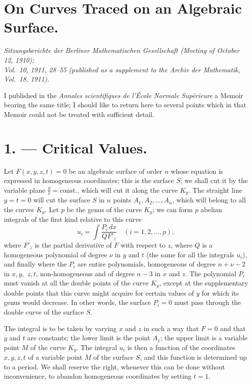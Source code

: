 \documentclass{article}
\begin{document}
\section*{On Curves Traced on an Algebraic Surface.}

\begin{center}
\emph{Sitzungsberichte der Berliner Mathematischen Gesellschaft (Meeting of October 12, 1910);}\\
\emph{Vol.~10, 1911, 28--55 (published as a supplement to the Archiv der Mathematik, Vol.~18, 1911).}
\end{center}

I published in the \emph{Annales scientifiques de l'École Normale Supérieure} a Memoir bearing the same title; I should like to return here to several points which in that Memoir could not be treated with sufficient detail.

\section*{1. --- Critical Values.}

Let $F(x, y, z, t) = 0$ be an algebraic surface of order $n$ whose equation is expressed in homogeneous coordinates; this is the surface $S$; we shall cut it by the variable plane $\frac{y}{t} = \text{const.}$, which will cut it along the curve $K_{y}$. The straight line $y = t = 0$ will cut the surface $S$ in $n$ points $A_{1}, A_{2}, \ldots, A_{n}$, which will belong to all the curves $K_{y}$. Let $p$ be the genus of the curve $K_{y}$; we can form $p$ abelian integrals of the first kind relative to this curve
\[
u_{i} = \int \frac{P_{i}\,dx}{Q F'_{z}} \quad (i = 1, 2, \ldots, p),
\]
where $F'_{z}$ is the partial derivative of $F$ with respect to $z$, where $Q$ is a homogeneous polynomial of degree $\nu$ in $y$ and $t$ (the same for all the integrals $u_{i}$), and finally where the $P_{i}$ are entire polynomials, homogeneous of degree $n + \nu - 2$ in $x, y,$
$z, t$, non-homogeneous and of degree $n - 3$ in $x$ and $z$. The polynomial $P_{i}$ must vanish at all the double points of the curve $K_{y}$, except at the supplementary double points that this curve might acquire for certain values of $y$ for which its genus would decrease. In other words, the surface $P_{i} = 0$ must pass through the double curve of the surface $S$.

The integral is to be taken by varying $x$ and $z$ in such a way that $F = 0$ and that $y$ and $t$ are constants; the lower limit is the point $A_{1}$; the upper limit is a variable point $M$ of the curve $K_{y}$. The integral $u_{i}$ is then a function of the coordinates $x, y, z, t$ of a variable point $M$ of the surface $S$, and this function is determined up to a period. We shall reserve the right, whenever this can be done without inconvenience, to abandon homogeneous coordinates by setting $t = 1$.
\end{document}
